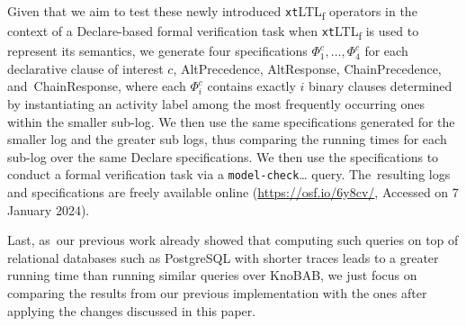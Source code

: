 \documentclass[information,article,accept,pdftex,oneauthor]{Definitions/mdpi}
\begin{document}
 Given that we aim to test these newly introduced \texttt{xt}LTL\textsubscript{f} operators in the context of a Declare-based formal verification task when \texttt{xt}LTL\textsubscript{f} is used to represent its semantics, we generate four specifications $\Phi^c_1,\dots,\Phi^c_4$ for each declarative clause of interest $c$, \textsf{AltPrecedence}, \textsf{AltResponse}, \textsf{ChainPrecedence}, and~\textsf{Chain\-Response}, where each $\Phi^c_i$ contains exactly $i$ binary clauses determined by instantiating an activity label among the most frequently occurring ones within the smaller sub-log. We then use the same specifications generated for the smaller log and the greater sub logs, thus comparing the running times for each sub-log over the same Declare specifications. We then use the specifications to conduct a formal  verification task via a {\color{oceanboatblue} {\texttt{model-check}\ldots}}  query. The~resulting logs and specifications are freely available online (\url{https://osf.io/6y8cv/}, Accessed on 7 January 2024). 

Last, as~our previous work already showed that computing such queries on top of relational databases such as PostgreSQL with shorter traces leads to a greater running time than running similar queries over KnoBAB, we just focus on comparing the results from our previous implementation with the ones after applying the changes discussed in this paper.
\medskip
\end{document}

